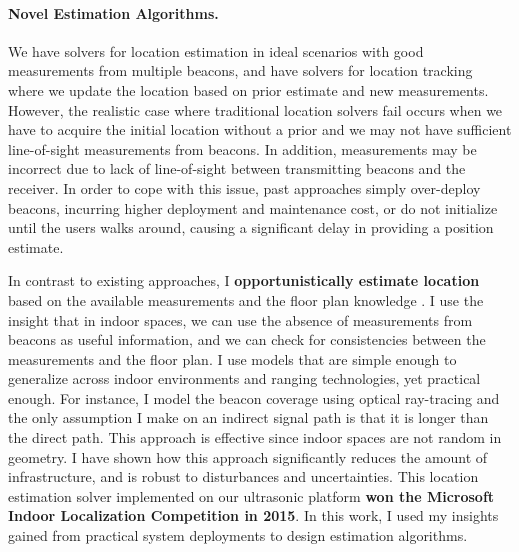 \documentclass[10pt]{article}
\begin{document}
\paragraph{Novel Estimation Algorithms. } 
We have solvers for location estimation in ideal scenarios with good measurements from multiple beacons, and have solvers for location tracking where we update the location based on prior estimate and new measurements. However, the realistic case where traditional location solvers fail occurs when we have to acquire the initial location without a prior and we may not have sufficient line-of-sight measurements from beacons. In addition, measurements may be incorrect due to lack of line-of-sight between transmitting beacons and the receiver. In order to cope with this issue, past approaches simply over-deploy beacons, incurring higher deployment and maintenance cost, or do not initialize until the users walks around, causing a significant delay in providing a position estimate.

In contrast to existing approaches, I \textbf{opportunistically estimate location} based on the available measurements and the floor plan knowledge \cite{rajagopal2018enhancing}. I use the insight that in indoor spaces, we can use the absence of measurements from beacons as useful information, and we can check for consistencies between the measurements and the floor plan. I use models that are simple enough to generalize across indoor environments and ranging technologies, yet practical enough. For instance, I model the beacon coverage using optical ray-tracing and the only assumption I make on an indirect  signal path is that it is longer than the direct path. This approach is effective since indoor spaces are not random in geometry.  %
I have shown how this approach significantly reduces the amount of infrastructure, and is robust to %
disturbances and uncertainties. %
This location estimation solver implemented on our ultrasonic platform \textbf{won the Microsoft Indoor Localization Competition in 2015}. In this work, I used my insights gained from practical system deployments to design estimation algorithms.%
\end{document}
